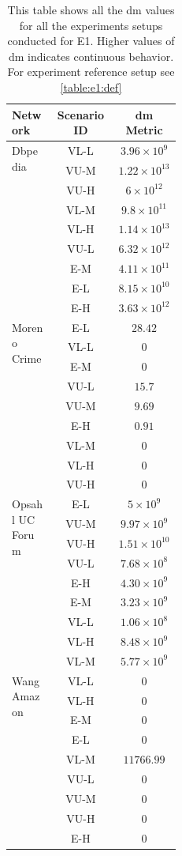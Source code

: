 \begin{table}[htp!]
  \centering
  \begin{tabular}{|p{0.25\linewidth}|c|c|}
    \hline
   \textbf{Network} & \textbf{Scenario ID} & \textbf{\acrshort{dm} Metric}\\
   \hline
   \multirow{9}{*}{Dbpedia} & VL-L & $3.96 \times 10^9$ \\
   & VU-M & $1.22 \times 10^{13}$ \\
   & VU-H & $6 \times 10^{12}$ \\
   & VL-M & $9.8 \times 10^{11}$ \\
   & VL-H & $1.14 \times 10^{13}$ \\
   & VU-L & $6.32 \times 10^{12}$ \\
   & E-M & $4.11 \times 10^{11}$ \\
   & E-L & $8.15 \times 10^{10}$ \\
   & E-H & $3.63 \times 10^{12}$ \\
   \hline
   \multirow{9}{*}{Moreno Crime} & E-L & $28.42$ \\
   & VL-L & $0$  \\
   & E-M & $0$  \\
   & VU-L & $15.7$ \\
   & VU-M & $9.69$ \\
   & E-H &  $0.91$ \\
   & VL-M & $0$  \\
   & VL-H & $0$  \\
   & VU-H & $0$  \\
   \hline
   \multirow{9}{*}{Opsahl UC Forum} & E-L & $5 \times 10^9$ \\
   &  VU-M & $9.97 \times 10^9$ \\
   &  VU-H & $1.51 \times 10^{10}$ \\
   &  VU-L & $7.68 \times 10^8$ \\
   &  E-H & $4.30 \times 10^9$ \\
   &  E-M & $3.23 \times 10^9$ \\
   &  VL-L & $1.06 \times 10^8$ \\
   &  VL-H & $8.48 \times 10^9$ \\
   &  VL-M & $5.77 \times 10^9$ \\
   \hline
   \multirow{9}{*}{Wang Amazon} &  VL-L & $0$ \\
   &  VL-H & $0$\\
   &  E-M & $0$\\
   &  E-L & $0$\\
   &  VL-M & $11766.99$ \\
   &  VU-L & $0$ \\
   &  VU-M & $0$ \\
   &  VU-H & $0$ \\
   &  E-H & $0$\\
   \hline
  \end{tabular}
 \caption[{[EE] E1 \acrshort{dm} values}]{This table shows all the \acrshort{dm} values for all the experiments setups conducted for E1. Higher values of \acrshort{dm} indicates continuous behavior. For experiment reference setup see \autoref{table:e1:def}}
 \label{table:e1:dm:values}
 \end{table}

